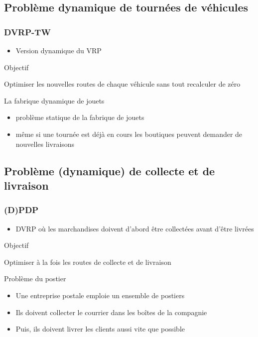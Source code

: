 \documentclass{beamer}
\begin{document}
\subsection*{Problème dynamique de tournées de véhicules}
\begin{frame}
	\frametitle{DVRP-TW\cite{Mitrovic01}}
	\begin{itemize}
 		\item Version dynamique du VRP
	\end{itemize}
	\begin{block}{Objectif}
		\begin{center}
			Optimiser les nouvelles routes de chaque véhicule sans tout recalculer de zéro
		\end{center}
	\end{block}	
	
	\begin{exampleblock}{La fabrique dynamique de jouets}
		\begin{itemize}
			\item problème statique de la fabrique de jouets
			\item même si une tournée est déjà en cours les boutiques peuvent demander de nouvelles livraisons
		\end{itemize}
	\end{exampleblock}
\end{frame}

\subsection*{Problème (dynamique) de collecte et de livraison}
\begin{frame}
 \frametitle{(D)PDP}
	\begin{itemize}
	 \item DVRP où les marchandises doivent d'abord être collectées avant d'être livrées
	\end{itemize}
	
	\begin{block}{Objectif}
		\begin{center}
			Optimiser à la fois les routes de collecte et de livraison
		\end{center}
	\end{block}	
	\begin{exampleblock}{Problème du postier}
		\begin{itemize}
			\item Une entreprise postale emploie un ensemble de postiers
			\item Ils doivent collecter le courrier dans les boîtes de la compagnie
			\item Puis, ils doivent livrer les clients aussi vite que possible
		\end{itemize}
	\end{exampleblock}

\end{frame}
\end{document}
